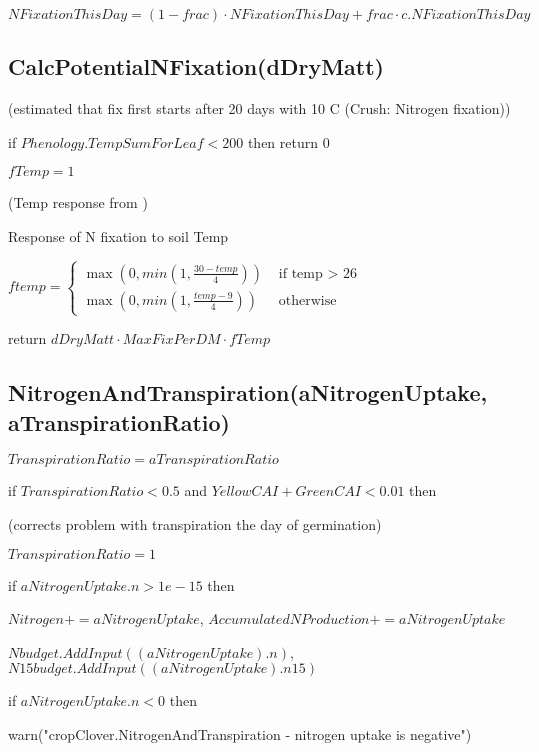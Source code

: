 \documentclass[%
]{scrartcl}
\begin{document}
   $NFixationThisDay=(1-frac)  \cdot  NFixationThisDay + frac  \cdot  c.NFixationThisDay$


\subsection{CalcPotentialNFixation(dDryMatt)}

   (estimated that fix first starts after 20 days with 10 \textdegree C (Crush: Nitrogen fixation))

   if $Phenology.TempSumForLeaf<200$ then  return $0$                          
 	

   $fTemp = 1$  
                                          
   (Temp response from \citet[]{wu1999simulation})

   Response of N fixation to soil Temp  \citep{liu2011models}
  
   $ftemp = \begin{cases}
             \max\left(0,min\left(1,\tfrac{30-temp}{4}\right)\right) & \text{ if temp > 26} \\
             \max\left(0,min\left(1,\tfrac{temp-9}{4}\right)\right)  & \text{ otherwise}
            \end{cases}$

   return $dDryMatt  \cdot  MaxFixPerDM  \cdot  fTemp$


\subsection{NitrogenAndTranspiration(aNitrogenUptake, aTranspirationRatio)}


   $TranspirationRatio = aTranspirationRatio$

   if $TranspirationRatio<0.5$  and  $YellowCAI+GreenCAI<0.01$  then

   \quad (corrects problem with transpiration the day of germination)

   \quad $TranspirationRatio = 1$

   if $aNitrogenUptake.n>1e-15$ then

     \quad  $Nitrogen += aNitrogenUptake$, $AccumulatedNProduction += aNitrogenUptake$

     \quad $Nbudget.AddInput((aNitrogenUptake).n)$,     
      $N15budget.AddInput((aNitrogenUptake).n15)$
   
   if $aNitrogenUptake.n<0$ then

      \quad warn("cropClover.NitrogenAndTranspiration - nitrogen uptake is negative")
   
\end{document}
